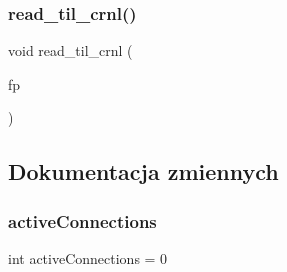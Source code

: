 \subsubsection{\texorpdfstring{read\_til\_crnl()}{read\_til\_crnl()}}
{\footnotesize\ttfamily void read\+\_\+til\+\_\+crnl (\begin{DoxyParamCaption}\item[{F\+I\+LE $\ast$}]{fp }\end{DoxyParamCaption})}



\subsection{Dokumentacja zmiennych}
\mbox{\label{serwer-www_8c_a1f5bcbe2b6bbbf057f1e857d6466ac34}} 
\subsubsection{\texorpdfstring{activeConnections}{activeConnections}}
{\footnotesize\ttfamily int active\+Connections = 0}

